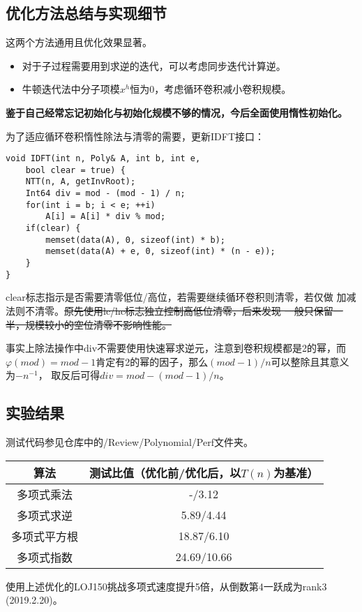 \subsection{优化方法总结与实现细节}
这两个方法通用且优化效果显著。
\begin{itemize}
    \item 对于子过程需要用到求逆的迭代，可以考虑同步迭代计算逆。
    \item 牛顿迭代法中分子项模$x^h$恒为0，考虑循环卷积减小卷积规模。
\end{itemize}

{\bfseries 鉴于自己经常忘记初始化与初始化规模不够的情况，今后全面使用惰性初始化。}

为了适应循环卷积惰性除法与清零的需要，更新IDFT接口：
\begin{lstlisting}
void IDFT(int n, Poly& A, int b, int e,
    bool clear = true) {
    NTT(n, A, getInvRoot);
    Int64 div = mod - (mod - 1) / n;
    for(int i = b; i < e; ++i)
        A[i] = A[i] * div % mod;
    if(clear) {
        memset(data(A), 0, sizeof(int) * b);
        memset(data(A) + e, 0, sizeof(int) * (n - e));
    }
}
\end{lstlisting}

clear标志指示是否需要清零低位/高位，若需要继续循环卷积则清零，若仅做
加减法则不清零。\sout{原先使用lc/hc标志独立控制高低位清零，后来发现
一般只保留一半，规模较小的空位清零不影响性能。}

事实上除法操作中div不需要使用快速幂求逆元，注意到卷积规模都是2的幂，而
$\varphi(mod)=mod-1$肯定有2的幂的因子，那么$(mod-1)/n$可以整除且其意义为$-n^{-1}$，
取反后可得$div=mod-(mod-1)/n$。
\subsection{实验结果}
测试代码参见仓库中的/Review/Polynomial/Perf文件夹。

\begin{tabular}{c|c}
\hline
算法 & 测试比值（优化前/优化后，以$T(n)$为基准）\\
\hline
多项式乘法 & -/3.12\\
多项式求逆&5.89/4.44\\
多项式平方根&18.87/6.10\\
多项式指数&24.69/10.66\\
\hline
\end{tabular}

使用上述优化的LOJ150挑战多项式速度提升5倍，从倒数第4一跃成为rank3\\(2019.2.20)。
